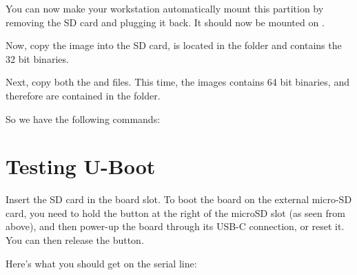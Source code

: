 You can now make your workstation automatically mount this
partition by removing the SD card and plugging it back. It should
now be mounted on .

Now, copy the  image into the SD card,
 is located in the
folder and contains the 32 bit binaries.

Next, copy both the  and  files.
This time, the images contains 64 bit binaries, and therefore are contained
in the 
folder.

So we have the following commands:

\section{Testing U-Boot}

Insert the SD card in the board slot. To boot the board on the external micro-SD
card, you need to hold the  button at the right of the
microSD slot (as seen from above), and then power-up the board through
its USB-C connection, or reset it. You can then release the
 button.

Here's what you should get on the serial line:

